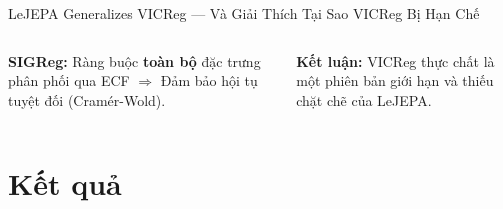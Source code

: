 \documentclass[aspectratio=169,9pt]{beamer}
\begin{document}
\begin{frame}{LeJEPA Generalizes VICReg — Và Giải Thích Tại Sao VICReg Bị Hạn Chế}
\begin{columns}[T]
\vspace{0.6em}
\begin{goodbox}
\footnotesize \textbf{SIGReg:} Ràng buộc \textbf{toàn bộ} đặc trưng phân phối qua ECF $\Rightarrow$ Đảm bảo hội tụ tuyệt đối (Cramér-Wold).
\end{goodbox}

\vspace{0.6em}
\begin{accentbox}
\footnotesize \textbf{Kết luận:} VICReg thực chất là một phiên bản giới hạn và thiếu chặt chẽ của LeJEPA.
\end{accentbox}

\end{columns}
\end{frame}
\fi %


\section{Kết quả}





\end{document}
